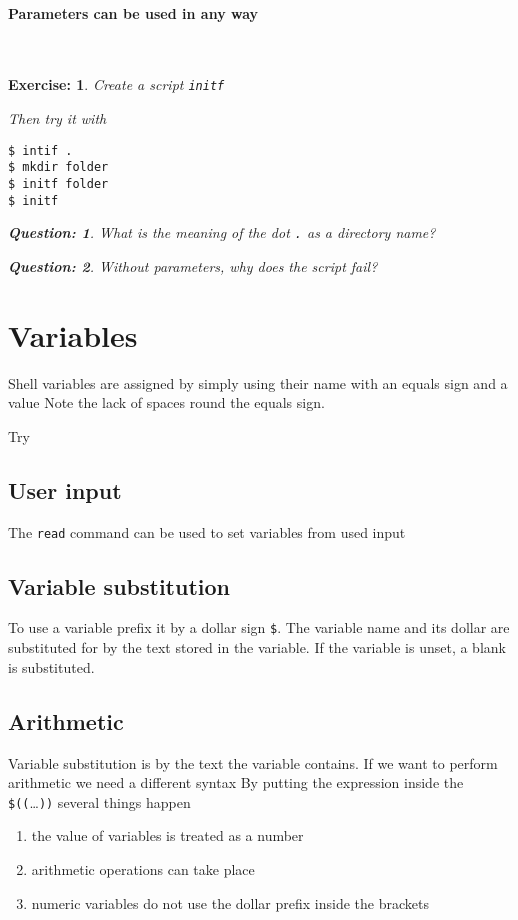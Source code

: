 \documentclass[12pt,a4paper]{article}
\newtheorem{exercise}{Exercise:}
\newtheorem{question}{Question:}
\begin{document}
\paragraph{Parameters can be used in any way}~\\
\begin{exercise}Create a script \texttt{initf}
\begin{code}[title=\texttt{inif}]
\end{code}
Then try it with
\begin{terminal}
\begin{verbatim}
$ intif .
$ mkdir folder
$ initf folder
$ initf
\end{verbatim}
\end{terminal}
\begin{question}
  What is the meaning of the dot \texttt{.} as a directory name?
\end{question}
\begin{question}
  Without parameters, why does the script fail?
\end{question}
\end{exercise}

\section{Variables}
Shell variables are assigned by simply using their name with an equals
sign and a value
Note the lack of spaces round the equals sign.

Try

\subsection{User input}
The \texttt{read} command can be used to set variables from used input
\subsection{Variable substitution}
To use a variable prefix it by a dollar sign \texttt{\$}.  The
variable name and its dollar are substituted for by the text stored in
the variable.  If the variable is unset, a blank is substituted.

\subsection{Arithmetic}
Variable substitution is by the text the variable contains.  If we
want to perform arithmetic we need a different syntax
By putting the expression inside the \texttt{\$((}\ldots\texttt{))}
several things happen
\begin{enumerate}
\item the value of variables is treated as a number
\item arithmetic operations can take place
\item numeric variables do not use the dollar prefix inside the brackets
\end{enumerate}
\end{document}
